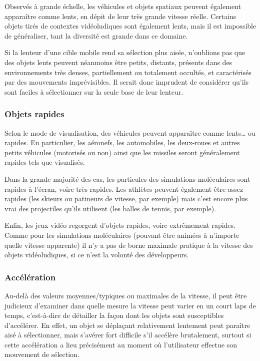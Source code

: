 	Observés à grande échelle, les véhicules et objets spatiaux peuvent également apparaître comme lents, en dépit de leur très grande vitesse réelle. Certains objets tirés de contextes vidéoludiques sont également lents, mais il est impossible de généraliser, tant la diversité est grande dans ce domaine.
	
	Si la lenteur d'une cible mobile rend sa sélection plus aisée, n'oublions pas que des objets lents peuvent néanmoins être petits, distants, présents dans des environnements très denses, partiellement ou totalement occultés, et caractérisés par des mouvements imprévisibles. Il serait donc imprudent de considérer qu'ils sont \og faciles \fg{} à sélectionner sur la seule base de leur lenteur.
	
	\FloatBarrier \subsubsection{Objets rapides}
	Selon le mode de visualisation, des véhicules peuvent apparaître comme lents\ldots{} ou rapides. En particulier, les aéronefs, les automobiles, les deux-roues et autres petits véhicules (motorisés ou non) ainsi que les missiles seront généralement rapides tels que visualisés.
	
	Dans la grande majorité des cas, les particules des simulations moléculaires sont rapides à l'écran, voire très rapides. Les athlètes peuvent également être assez rapides (les skieurs ou patineurs de vitesse, par exemple) mais c'est encore plus vrai des projectiles qu'ils utilisent (les balles de tennis, par exemple).
	
	Enfin, les jeux vidéo regorgent d'objets rapides, voire extrêmement rapides. Comme pour les simulations moléculaires (pouvant être animées à n'importe quelle vitesse apparente) il n'y a pas de borne maximale pratique à la vitesse des objets vidéoludiques, si ce n'est la volonté des développeurs.
	
	\FloatBarrier \subsubsection{Accélération}
	Au-delà des valeurs moyennes/typiques ou maximales de la vitesse, il peut être judicieux d'examiner dans quelle mesure la vitesse peut varier en un court laps de temps, c'est-à-dire de détailler la façon dont les objets sont susceptibles d'accélérer. En effet, un objet se déplaçant relativement lentement peut paraître aisé à sélectionner, mais s'avérer fort difficile s'il accélère brutalement, surtout si cette accélération a lieu précisément au moment où l'utilisateur effectue son mouvement de sélection.
	
